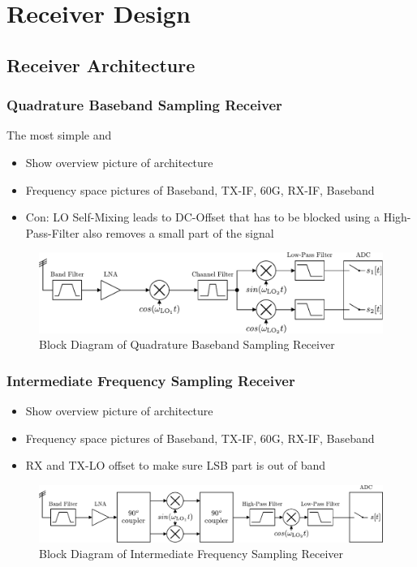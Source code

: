 \chapter{Receiver Design}
\section{Receiver Architecture}
\subsection{Quadrature Baseband Sampling Receiver}
The most simple and
\begin{itemize}
\item Show overview picture of architecture
\item Frequency space pictures of Baseband, TX-IF, 60G, RX-IF, Baseband
\item Con: LO Self-Mixing leads to DC-Offset that has to be blocked using a
  High-Pass-Filter also removes a small part of the signal
\end{itemize}

\begin{figure}[ht]
  \centering
  \includegraphics[width=\textwidth]{figures/quad_base_rx_block_diagram}
  \caption{Block Diagram of Quadrature Baseband Sampling Receiver}
  \label{fig:rx_quad_base_bd}
\end{figure}

\subsection{Intermediate Frequency Sampling Receiver}
\begin{itemize}
\item Show overview picture of architecture
\item Frequency space pictures of Baseband, TX-IF, 60G, RX-IF, Baseband
\item RX and TX-LO offset to make sure LSB part is out of band
\end{itemize}

\begin{figure}[ht]
  \centering
  \includegraphics[width=\textwidth]{figures/if_rx_block_diagram}
  \caption{Block Diagram of Intermediate Frequency Sampling Receiver}
  \label{fig:rx_if_bd}
\end{figure}


